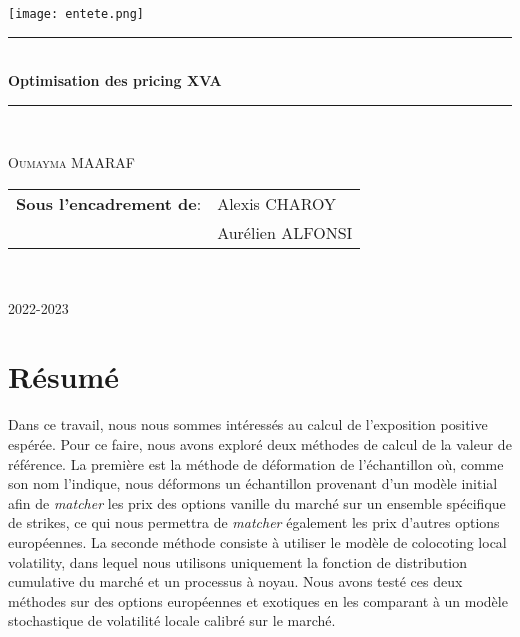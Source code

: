\documentclass[a4paper,12pt]{report}
\numberwithin{equation}{section}
\theoremstyle{definition}
\numberwithin{equation}{section}
\begin{document}
\begin{titlepage}
\newcommand{\HRule}{\rule{\linewidth}{0.5mm}}
\begin{center}
\texttt{[image: entete.png]} \\[1cm]
\HRule \\[0.4cm]
{ \huge \bfseries Optimisation des pricing XVA \\[0.15cm] }
\HRule \\
\end{center}
\vspace*{1.7cm}
\begin{center}
\large \textsc{Oumayma MAARAF}
\end{center}

\vspace*{0.3cm}
\begin{tabular}{ll}
\large \textbf{Sous l'encadrement de}:& \large Alexis CHAROY\\
& \large Aurélien ALFONSI
\end{tabular}
\\
\vspace*{11cm}
\begin{center}
{\large 2022-2023}

\end{center}

\vfill 
\end{titlepage}

\newpage
\chapter*{Résumé}
Dans ce travail, nous nous sommes intéressés au calcul de l'exposition positive espérée. Pour ce faire, nous avons exploré deux méthodes de calcul de la valeur de référence.  La première est la méthode de déformation de l'échantillon où, comme son nom l'indique, nous déformons un échantillon provenant d'un modèle initial afin de \textit{matcher} les prix des options vanille du marché sur un ensemble spécifique de strikes, ce qui nous permettra de \textit{matcher} également les prix d'autres options européennes. La seconde méthode consiste à utiliser le modèle de colocoting local volatility, dans lequel nous utilisons uniquement la fonction de distribution cumulative du marché et un processus à noyau. Nous avons testé ces deux méthodes sur des options européennes et exotiques en les comparant à un modèle stochastique de volatilité locale calibré sur le marché.
\end{document}

